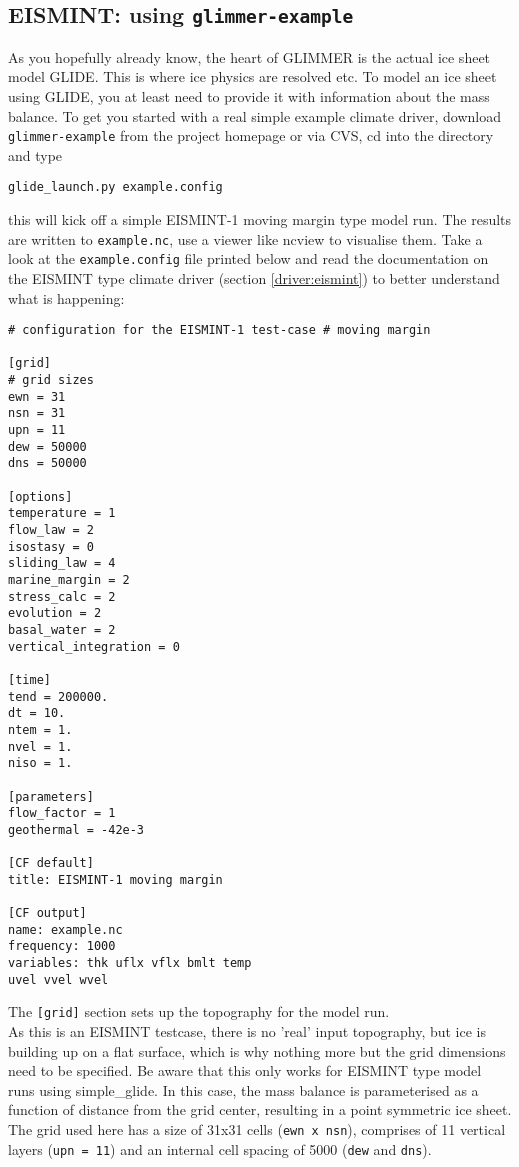 
\subsection{EISMINT: using \texttt{glimmer-example}}
As you hopefully already know, the heart of GLIMMER is the actual ice sheet model
GLIDE. This is where ice physics are resolved etc. To model an ice sheet using
GLIDE, you at least need to provide it with information about the 
mass balance. To get you started with a real simple example climate driver,
download \texttt{glimmer-example} from the project homepage or via CVS, cd into
the directory and type
\begin{verbatim}
glide_launch.py example.config
\end{verbatim}
this will kick off a simple EISMINT-1 moving margin type model run. The results
are written to \texttt{example.nc}, use a viewer like ncview to visualise them.
Take a look at the \texttt{example.config} file printed below and read the documentation on
the EISMINT type climate driver (section \ref{driver:eismint}) to better understand what is happening:\\

\begin{verbatim}
# configuration for the EISMINT-1 test-case # moving margin

[grid]
# grid sizes
ewn = 31
nsn = 31
upn = 11
dew = 50000
dns = 50000

[options]
temperature = 1
flow_law = 2
isostasy = 0
sliding_law = 4
marine_margin = 2
stress_calc = 2
evolution = 2
basal_water = 2
vertical_integration = 0

[time]
tend = 200000.
dt = 10.
ntem = 1.
nvel = 1.
niso = 1.

[parameters]
flow_factor = 1
geothermal = -42e-3

[CF default]
title: EISMINT-1 moving margin

[CF output]
name: example.nc
frequency: 1000
variables: thk uflx vflx bmlt temp
uvel vvel wvel
\end{verbatim}

The \texttt{[grid]} section sets up the topography for the model run.\\
As this is an EISMINT testcase, there is no 'real' input topography, but ice is building up on a
flat surface, which is why nothing more but the grid dimensions need to be specified. Be aware that
this only works for EISMINT type model runs using simple\_glide.
In this case, the mass balance is parameterised as a function of distance
from the grid center, resulting in a point symmetric ice sheet.
The grid used here has a size of 31x31 cells (\texttt{ewn x
nsn}), comprises of 11 vertical layers (\texttt{upn = 11}) and an internal cell spacing of
5000 (\texttt{dew} and \texttt{dns}).

